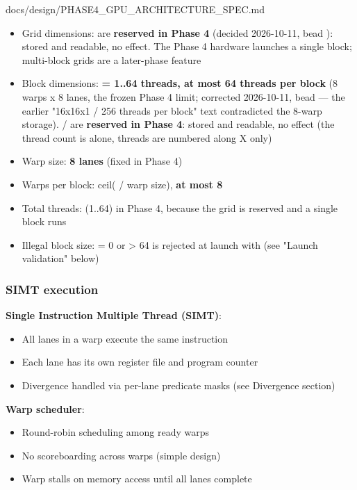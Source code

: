 \begin{relocated}{docs/design/PHASE4_GPU_ARCHITECTURE_SPEC.md}
\begin{itemize}
\tightlist
\item
  Grid dimensions:  are \textbf{reserved in
  Phase 4} (decided 2026-10-11, bead ): stored and readable,
  no effect. The Phase 4 hardware launches a single block; multi-block
  grids are a later-phase feature
\item
  Block dimensions: \textbf{ = 1..64 threads, at most
  64 threads per block} (8 warps x 8 lanes, the frozen Phase 4 limit;
  corrected 2026-10-11, bead  --- the earlier "16x16x1 / 256
  threads per block" text contradicted the 8-warp storage).
   /  are \textbf{reserved in Phase
  4}: stored and readable, no effect (the thread count is
   alone, threads are numbered along X only)
\item
  Warp size: \textbf{8 lanes} (fixed in Phase 4)
\item
  Warps per block: ceil( / warp size), \textbf{at most
  8}
\item
  Total threads:  (1..64) in Phase 4, because the grid
  is reserved and a single block runs
\item
  Illegal block size:  = 0 or \textgreater{} 64 is
  rejected at launch with  (see "Launch
  validation" below)
\end{itemize}

\subsubsection{SIMT execution}\label{ds:ch:phase4-gpu-architecture:simt-execution}

\textbf{Single Instruction Multiple Thread (SIMT)}:

\begin{itemize}
\tightlist
\item
  All lanes in a warp execute the same instruction
\item
  Each lane has its own register file and program counter
\item
  Divergence handled via per-lane predicate masks (see Divergence
  section)
\end{itemize}

\textbf{Warp scheduler}:

\begin{itemize}
\tightlist
\item
  Round-robin scheduling among ready warps
\item
  No scoreboarding across warps (simple design)
\item
  Warp stalls on memory access until all lanes complete
\end{itemize}


\end{relocated}
